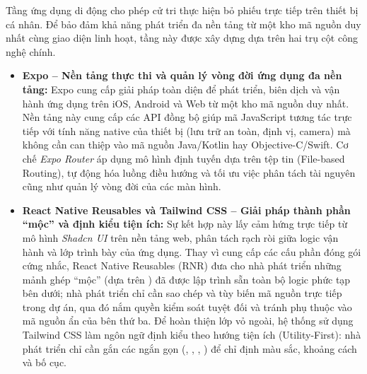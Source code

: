 Tầng ứng dụng di động cho phép cử tri thực hiện bỏ phiếu trực tiếp trên thiết bị cá nhân. Để bảo đảm khả năng phát triển đa nền tảng từ một kho mã nguồn duy nhất cùng giao diện linh hoạt, tầng này được xây dựng dựa trên hai trụ cột công nghệ chính.

\begin{itemize}
    \item \textbf{Expo -- Nền tảng thực thi và quản lý vòng đời ứng dụng đa nền tảng:} Expo cung cấp giải pháp toàn diện để phát triển, biên dịch và vận hành ứng dụng trên iOS, Android và Web từ một kho mã nguồn duy nhất. Nền tảng này cung cấp các API đồng bộ giúp mã JavaScript tương tác trực tiếp với tính năng native của thiết bị (lưu trữ an toàn, định vị, camera) mà không cần can thiệp vào mã nguồn Java/Kotlin hay Objective-C/Swift. Cơ chế \textit{Expo Router} áp dụng mô hình định tuyến dựa trên tệp tin (File-based Routing), tự động hóa luồng điều hướng và tối ưu việc phân tách tài nguyên cũng như quản lý vòng đời của các màn hình.

    \item \textbf{React Native Reusables và Tailwind CSS -- Giải pháp thành phần ``mộc'' và định kiểu tiện ích:} Sự kết hợp này lấy cảm hứng trực tiếp từ mô hình \textit{Shadcn UI} trên nền tảng web, phân tách rạch ròi giữa logic vận hành và lớp trình bày của ứng dụng. Thay vì cung cấp các cấu phần đóng gói cứng nhắc, React Native Reusables (RNR) đưa cho nhà phát triển những mảnh ghép ``mộc'' (dựa trên ) đã được lập trình sẵn toàn bộ logic phức tạp bên dưới; nhà phát triển chỉ cần sao chép và tùy biến mã nguồn trực tiếp trong dự án, qua đó nắm quyền kiểm soát tuyệt đối và tránh phụ thuộc vào mã nguồn ẩn của bên thứ ba. Để hoàn thiện lớp vỏ ngoài, hệ thống sử dụng Tailwind CSS làm ngôn ngữ định kiểu theo hướng tiện ích (Utility-First): nhà phát triển chỉ cần gắn các  ngắn gọn (, , , ) để chỉ định màu sắc, khoảng cách và bố cục.
\end{itemize}
